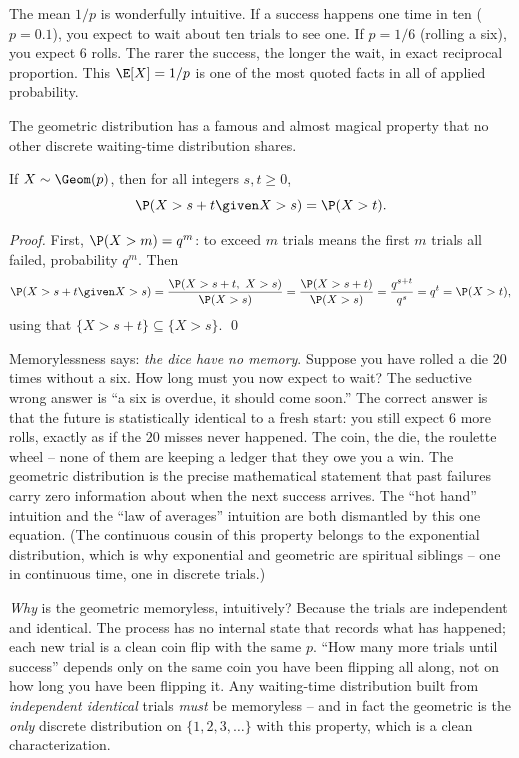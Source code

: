 \begin{intuitionbox}
The mean $1/p$ is wonderfully intuitive. If a success happens one time in ten
($p = 0.1$), you expect to wait about ten trials to see one. If $p = 1/6$ (rolling
a six), you expect $6$ rolls. The rarer the success, the longer the wait, in exact
reciprocal proportion. This $\E[X] = 1/p$ is one of the most quoted facts in all
of applied probability.
\end{intuitionbox}

The geometric distribution has a famous and almost magical property that no other
discrete waiting-time distribution shares.

\begin{theorem}[Memorylessness]
\label{ch07:geom-memoryless}
If $X \sim \Geom(p)$, then for all integers $s, t \ge 0$,
\[
  \P(X > s + t \given X > s) = \P(X > t).
\]
\end{theorem}

\begin{proof}
First, $\P(X > m) = q^{m}$: to exceed $m$ trials means the first $m$ trials all
failed, probability $q^m$. Then
\[
  \P(X > s+t \given X > s)
  = \frac{\P(X > s+t,\ X > s)}{\P(X > s)}
  = \frac{\P(X > s+t)}{\P(X > s)}
  = \frac{q^{s+t}}{q^{s}} = q^{t} = \P(X > t),
\]
using that $\{X > s+t\} \subseteq \{X > s\}$. \qed
\end{proof}

\begin{paradoxbox}
Memorylessness says: \emph{the dice have no memory}. Suppose you have rolled a die
$20$ times without a six. How long must you now expect to wait? The seductive
wrong answer is ``a six is overdue, it should come soon.'' The correct answer is
that the future is statistically identical to a fresh start: you still expect $6$
more rolls, exactly as if the $20$ misses never happened. The coin, the die, the
roulette wheel -- none of them are keeping a ledger that they owe you a win. The
geometric distribution is the precise mathematical statement that past failures
carry zero information about when the next success arrives. The ``hot hand''
intuition and the ``law of averages'' intuition are both dismantled by this one
equation. (The continuous cousin of this property belongs to the exponential
distribution, which is why exponential and geometric are spiritual siblings -- one
in continuous time, one in discrete trials.)
\end{paradoxbox}

\begin{whybox}
\emph{Why} is the geometric memoryless, intuitively? Because the trials are
independent and identical. The process has no internal state that records what has
happened; each new trial is a clean coin flip with the same $p$. ``How many more
trials until success'' depends only on the same coin you have been flipping all
along, not on how long you have been flipping it. Any waiting-time distribution
built from \emph{independent identical} trials \emph{must} be memoryless -- and in
fact the geometric is the \emph{only} discrete distribution on
$\{1,2,3,\dots\}$ with this property, which is a clean characterization.
\end{whybox}

